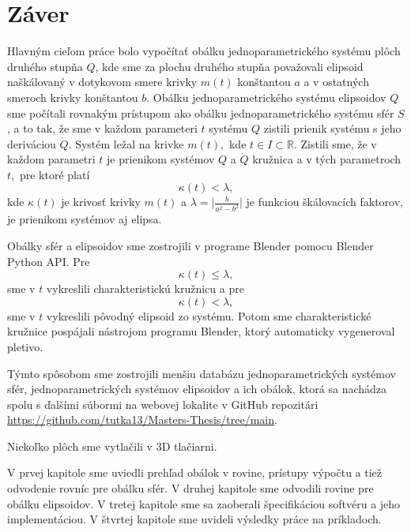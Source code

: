 \chapter*{Záver}
Hlavným cieľom práce bolo vypočítať obálku jednoparametrického systému plôch druhého stupňa $Q$, kde sme za plochu druhého stupňa považovali elipsoid naškálovaný v dotykovom smere krivky $m(t)$ konštantou $a$ a v ostatných smeroch krivky konštantou $b$. Obálku jednoparametrického systému elipsoidov $Q$ sme počítali rovnakým prístupom ako obálku jednoparametrického systému sfér $S$, a to tak, že sme v každom parameteri $t$ systému $Q$ zistili prienik systému s jeho deriváciou $\dot{Q}$. Systém ležal na krivke $m(t),$ kde $t \in I \subset \mathbb{R}.$
Zistili sme, že v každom parametri $t$ je prienikom systémov $Q$ a $\dot{Q}$ kružnica a v tých parametroch $t,$ pre ktoré platí
$$
\kappa(t) < \lambda,
$$  
kde $\kappa(t)$ je krivosť krivky $m(t)$ a $\lambda = \big| \frac{b}{a^2 - b^2} \big| $ je funkciou škálovacích faktorov, je prienikom systémov aj elipsa.

Obálky sfér a elipsoidov sme zostrojili v programe Blender pomocu Blender Python API. Pre 
$$
\kappa(t) \leq \lambda,
$$  
sme v $t$ vykreslili charakteristickú kružnicu a pre
$$
\kappa(t) < \lambda,
$$  
sme v $t$ vykreslili pôvodný elipsoid zo systému.
Potom sme charakteristické kružnice pospájali nástrojom programu Blender, ktorý automaticky vygeneroval pletivo. 

Týmto spôsobom sme zostrojili menšiu databázu jednoparametrických systémov sfér, jednoparametrických systémov elipsoidov a ich obálok, ktorá sa nachádza spolu s ďalšími súbormi na webovej lokalite v GitHub repozitári \url{https://github.com/tutka13/Masters-Thesis/tree/main}. 

Niekoľko plôch sme vytlačili v 3D tlačiarni.

V prvej kapitole sme uviedli prehľad obálok v rovine, prístupy výpočtu a tiež odvodenie rovníc pre obálku sfér. V druhej kapitole sme odvodili rovine pre obálku elipsoidov. V tretej kapitole sme sa zaoberali špecifikáciou softvéru a jeho implementáciou. V štvrtej kapitole sme uvideli výsledky práce na príkladoch.